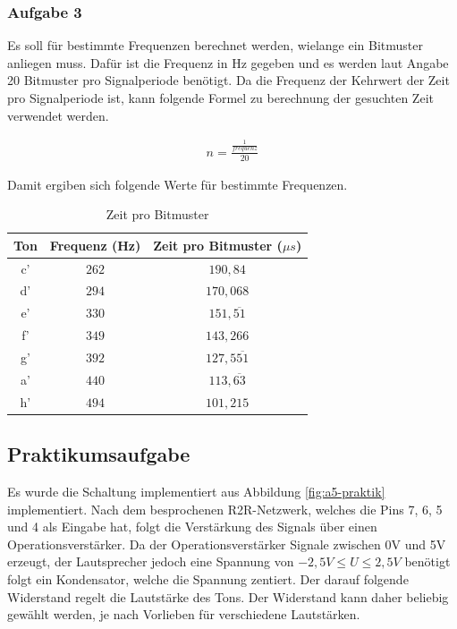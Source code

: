 \subsubsection{Aufgabe 3}

Es soll für bestimmte Frequenzen berechnet werden, wielange ein Bitmuster anliegen muss.
Dafür ist die Frequenz in Hz gegeben und es werden laut Angabe 20 Bitmuster pro Signalperiode benötigt.
Da die Frequenz der Kehrwert der Zeit pro Signalperiode ist, kann folgende Formel zu berechnung der gesuchten Zeit verwendet werden.

\begin{align}
    n = \frac{\frac{1}{frequenz}}{20}
\end{align}

Damit ergiben sich folgende Werte für bestimmte Frequenzen.

\begin{table}[h]
    \centering
    \caption{Zeit pro Bitmuster}
    \label{tab:zeit-pro-bitmuster}
    \begin{tabular}{| c | c | c |}
        \hline
        Ton & Frequenz (Hz) & Zeit pro Bitmuster ($\mu s$) \\
        \hline
        c' & $262$ & $190,84$ \\
        d' & $294$ & $170,068$ \\
        e' & $330$ & $151,\overline{51}$ \\
        f' & $349$ & $143,266$ \\
        g' & $392$ & $127,5\overline{51}$ \\
        a' & $440$ & $113,\overline{63}$ \\
        h' & $494$ & $101,215$ \\
        \hline
    \end{tabular}
\end{table}

\subsection{Praktikumsaufgabe}
\label{subsec:a5-praktikumsaufgabe}

Es wurde die Schaltung implementiert aus Abbildung \ref{fig:a5-praktik} implementiert.
Nach dem besprochenen R2R-Netzwerk, welches die Pins 7, 6, 5 und 4 als Eingabe hat, folgt die Verstärkung des Signals über einen Operationsverstärker.
Da der Operationsverstärker Signale zwischen 0V und 5V erzeugt, der Lautsprecher jedoch eine Spannung von $-2,5V \leq U \leq 2,5V$ benötigt folgt ein Kondensator, welche die Spannung zentiert.
Der darauf folgende Widerstand regelt die Lautstärke des Tons.
Der Widerstand kann daher beliebig gewählt werden, je nach Vorlieben für verschiedene Lautstärken.

